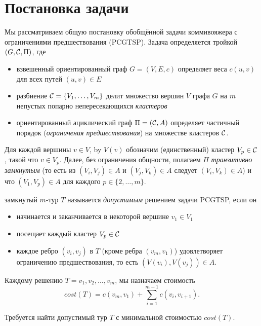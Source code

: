 \section{Постановка задачи}\label{sec:PS}
Мы рассматриваем общую постановку обобщённой задачи коммивояжера
с ограничениями предшествования
(PCGTSP). 
Задача определяется тройкой
$(G,\mathcal{C},\Pi)$, 
где
\begin{itemize}
	\item
	взвешенный ориентированный граф
	$G=(V,E,c)$
	определяет веса 
	$c(u,v)$
	для всех путей
	$(u,v)\in E$
	\item
	разбиение
	$\mathcal{C}=\{V_1,\ldots,V_m\}$
	делит множество вершин
	$V$ графа $G$ на $m$ 
	непустых попарно непересекающихся 
	{\it кластеров}
	\item
	ориентированный ациклический граф 
	$ \Pi = (\mathcal{C}, A) $ 
	определяет частичный порядок 
	(\textit{ограничения предшествования}) 
	на множестве кластеров $ \mathcal{C} $.
\end{itemize}

Для каждой вершины 
$v\in V$, by $V(v)$ 
обозначим (единственный) кластер 
$V_p\in\mathcal{C}$, 
такой что
$v\in V_p$. 
Далее,
без ограничения общности,
полагаем
$\Pi$ 
\textit{транзитивно замкнутым} 
(то есть из $(V_i,V_j)\in A$ и $(V_j,V_k)\in A$ следует $(V_i,V_k)\in A$) 
и что
$(V_1,V_p)\in A$ для каждого $p\in\{2,\ldots,m\}$.

замкнутый
$m$-тур $T$ 
называется \textit{допустимым} 
решением задачи PCGTSP, 
если он
\begin{itemize}
	\item
	начинается и заканчивается в некоторой вершине $v_1\in V_1$
	\item
	посещает каждый кластер $V_p\in\mathcal{C}$
	\item
	каждое ребро
	$(v_i, v_j)$ в $T$ 
	(кроме ребра $(v_m,v_1)$) 
	удовлетворяет ограничению предшествования,
	то есть
	 $(V(v_i),V(v_j))\in A$.
\end{itemize} 

Каждому решению
$T=v_1, v_2, \ldots, v_m$,
мы назначаем стоимость
$$
	cost(T) = c(v_m,v_1) + \sum_{i=1}^{m-1} c(v_i,v_{i+1}). 
$$ 

Требуется найти допустимый тур 
$ T $ 
с минимальной стоимостью $ cost (T) $.
